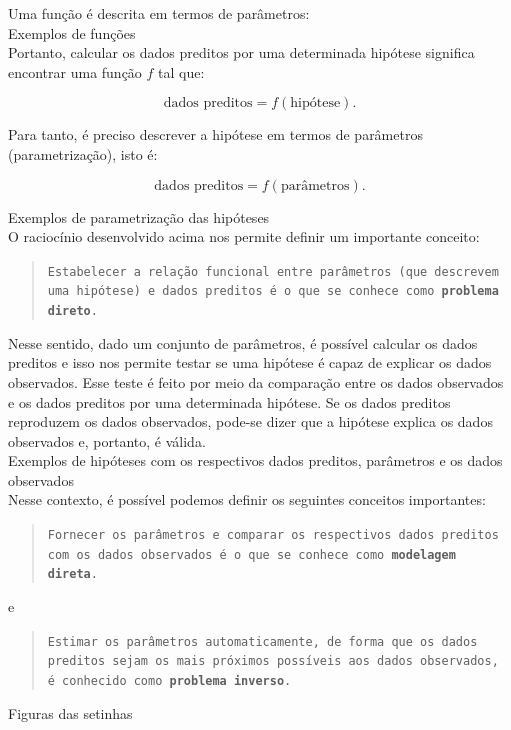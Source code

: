 Uma função é descrita em termos de parâmetros:
\\
Exemplos de funções
\\
\indent Portanto, calcular os dados preditos por uma determinada hipótese significa
encontrar uma função $f$ tal que:

\[
\text{dados preditos} = f(\text{hipótese}).
\]

\indent Para tanto, é preciso descrever a hipótese em termos de parâmetros
(parametrização), isto é:

\[
\text{dados preditos} = f(\text{parâmetros}).
\]

Exemplos de parametrização das hipóteses
\\
\indent O raciocínio desenvolvido acima nos permite definir um importante conceito:

\begin{quotation}
{\tt Estabelecer a relação funcional entre parâmetros (que descrevem uma hipótese)
e dados preditos é o que se co\-nhe\-ce como {\bf pro\-ble\-ma direto}.}
\end{quotation}

\indent Nesse sentido, dado um conjunto de parâmetros, é possível calcular os dados
preditos e isso nos permite testar se uma hipótese é capaz de explicar os dados
observados. Esse teste é feito por meio da comparação entre os dados observados
e os dados preditos por uma determinada hipótese. Se os dados preditos
reproduzem os dados observados, pode-se dizer que a hipótese explica os dados
observados e, portanto, é válida.
\\
Exemplos de hipóteses com os respectivos dados preditos, parâmetros e os dados observados
\\
\indent Nesse contexto, é possível podemos definir os seguintes conceitos importantes:

\begin{quotation}
{\tt Fornecer os parâmetros e comparar os respectivos dados preditos com os dados
observados é o que se conhece como {\bf mo\-de\-la\-gem direta}.}
\end{quotation}

e

\begin{quotation}
{\tt Estimar os parâmetros automaticamente, de forma que os dados preditos sejam os
mais próximos possíveis aos dados observados, é conhecido como {\bf problema inverso}.}
\end{quotation}

Figuras das setinhas
